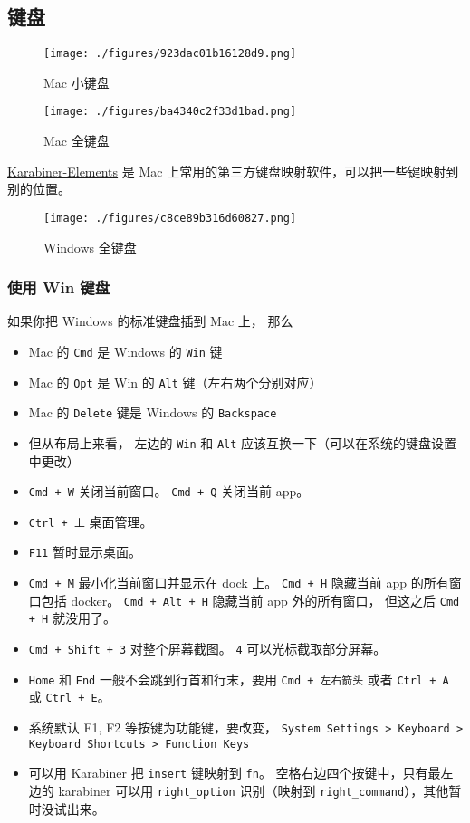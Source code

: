 
\subsection{键盘}

\begin{figure}[ht]
\centering
\texttt{[image: ./figures/923dac01b16128d9.png]}
\caption{Mac 小键盘} \label{fig_MacNt_5}
\end{figure}

\begin{figure}[ht]
\centering
\texttt{[image: ./figures/ba4340c2f33d1bad.png]}
\caption{Mac 全键盘} \label{fig_MacNt_4}
\end{figure}

\href{https://karabiner-elements.pqrs.org/}{Karabiner-Elements} 是 Mac 上常用的第三方键盘映射软件，可以把一些键映射到别的位置。

\begin{figure}[ht]
\centering
\texttt{[image: ./figures/c8ce89b316d60827.png]}
\caption{Windows 全键盘} \label{fig_MacNt_3}
\end{figure}

\subsubsection{使用 Win 键盘}
如果你把 Windows 的标准键盘插到 Mac 上， 那么
\begin{itemize}
\item Mac 的 \verb|Cmd| 是 Windows 的 \verb|Win| 键
\item Mac 的 \verb|Opt| 是 Win 的 \verb|Alt| 键（左右两个分别对应）
\item Mac 的 \verb|Delete| 键是 Windows 的 \verb|Backspace|
\item 但从布局上来看， 左边的 \verb|Win| 和 \verb|Alt| 应该互换一下（可以在系统的键盘设置中更改）
\item \verb|Cmd + W| 关闭当前窗口。 \verb|Cmd + Q| 关闭当前 app。
\item \verb|Ctrl + 上| 桌面管理。
\item \verb|F11| 暂时显示桌面。
\item \verb|Cmd + M| 最小化当前窗口并显示在 dock 上。 \verb`Cmd + H` 隐藏当前 app 的所有窗口包括 docker。 \verb`Cmd + Alt + H` 隐藏当前 app 外的所有窗口， 但这之后 \verb`Cmd + H` 就没用了。
\item \verb|Cmd + Shift + 3| 对整个屏幕截图。 \verb|4| 可以光标截取部分屏幕。
\item \verb|Home| 和 \verb|End| 一般不会跳到行首和行末，要用 \verb|Cmd + 左右箭头| 或者 \verb`Ctrl + A` 或 \verb`Ctrl + E`。
\item 系统默认 F1, F2 等按键为功能键，要改变， \verb`System Settings > Keyboard > Keyboard Shortcuts > Function Keys`
\item 可以用 Karabiner 把 \verb`insert` 键映射到 \verb`fn`。 空格右边四个按键中，只有最左边的 karabiner 可以用 \verb`right_option` 识别（映射到 \verb`right_command`），其他暂时没试出来。
\end{itemize}

